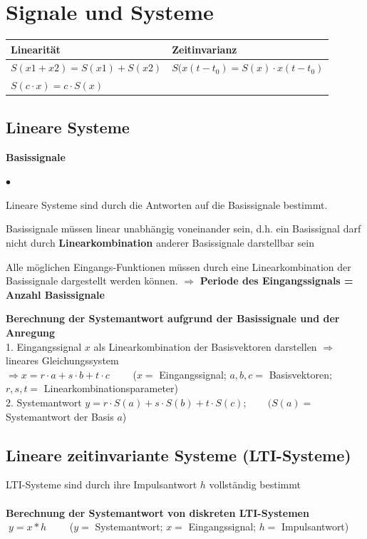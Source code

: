 \section{Signale und Systeme}
	\begin{tabular}{|l|l|}
    	\hline
    	\textbf{Linearität} & \textbf{Zeitinvarianz}\\
    	\hline
    	$S(x1+x2)=S(x1)+S(x2)$ & $S(x(t-t_0)=S(x)\cdot x(t-t_0)$ \\
    	$S(c\cdot x)=c\cdot S(x)$ & \\
		\hline    
    \end{tabular}
  	
	\subsection{Lineare Systeme}
		\textbf{Basissignale}
		\begin{list}{$\bullet$}{\setlength{\itemsep}{0cm} \setlength{\parsep}{0cm} \setlength{\topsep}{0cm}} 
          \item Lineare Systeme sind durch die Antworten auf die
          Basissignale bestimmt.
          \item Basissignale müssen linear unabhängig voneinander sein, d.h. ein
		Basissignal darf nicht durch \textbf{Linearkombination} anderer Basissignale
		darstellbar sein          
		  \item Alle möglichen Eingangs-Funktionen müssen durch eine Linearkombination der
		Basissignale dargestellt werden können. $\Rightarrow$ \textbf{Periode des Eingangssignals =	Anzahl Basissignale}
        \end{list}
        \vspace{.2cm}
		\textbf{Berechnung der Systemantwort aufgrund der Basissignale und der
		Anregung}\\
		1. Eingangssignal $x$ als Linearkombination der Basisvektoren darstellen
		$\Rightarrow$ lineares Gleichungssystem\\
		$\Rightarrow x=r\cdot a + s\cdot b + t\cdot c\qquad$ ($x=$
		Eingangssignal; $a,b,c=$ Basisvektoren; $r,s,t=$
		Linearkombinationsparameter)\\ 
		2. Systemantwort $y=r\cdot S(a) + s\cdot S(b) + t\cdot S(c); \qquad (S(a)=$
		Systemantwort der Basis $a$)
	
	\subsection{Lineare zeitinvariante Systeme (LTI-Systeme)}
		LTI-Systeme sind durch ihre Impulsantwort $h$ vollständig bestimmt\\ \\
		\textbf{Berechnung der Systemantwort von diskreten LTI-Systemen}\\
		$\; y=x*h \qquad$ ($y=$ Systemantwort; $x=$ Eingangssignal; $h=$
		Impulsantwort)\\
		
